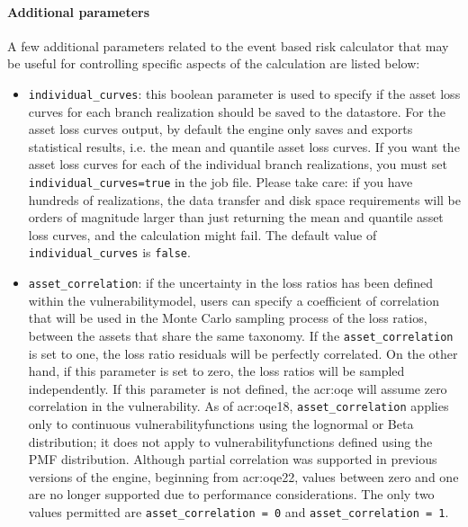 \paragraph{Additional parameters}

A few additional parameters related to the event based risk calculator that
may be useful for controlling specific aspects of the calculation are listed
below:

\begin{itemize}

  \item \Verb+individual_curves+: this boolean parameter is used to specify if
    the asset loss curves for each branch realization should be saved to the 
    datastore. For the asset loss curves output, by default the engine only 
    saves and exports statistical results, i.e. the mean and quantile asset 
    loss curves. If you want the asset loss curves for each of the individual 
    branch realizations, you must set \Verb+individual_curves=true+ in the job 
    file. Please take care: if you have hundreds of realizations, the data 
    transfer and disk space requirements will be orders of magnitude larger 
    than just returning the mean and quantile asset loss curves, and the 
    calculation might fail. The default value of \Verb+individual_curves+ is 
    \Verb+false+.

  \item \Verb+asset_correlation+: if the uncertainty in the loss ratios
    has been defined within the \gls{vulnerabilitymodel}, users can specify
    a coefficient of correlation that will be used in the Monte Carlo sampling
    process of the loss ratios, between the assets that share the same
    \gls{taxonomy}. If the \Verb+asset_correlation+ is set to one,
    the loss ratio residuals will be perfectly correlated. On the other hand,
    if this parameter is set to zero, the loss ratios will be sampled
    independently. If this parameter is not defined, the
    \glsdesc{acr:oqe} will assume zero correlation in the vulnerability. As of
    \glsdesc{acr:oqe18}, \Verb+asset_correlation+ applies only to continuous
    \glspl{vulnerabilityfunction} using the lognormal or Beta distribution; 
    it does not apply to \glspl{vulnerabilityfunction} defined using the PMF
    distribution. Although partial correlation was supported in previous
    versions of the engine, beginning from \glsdesc{acr:oqe22}, values between
    zero and one are no longer supported due to performance considerations. The
    only two values permitted are \Verb+asset_correlation = 0+ and 
    \Verb+asset_correlation = 1+.


\end{itemize}
